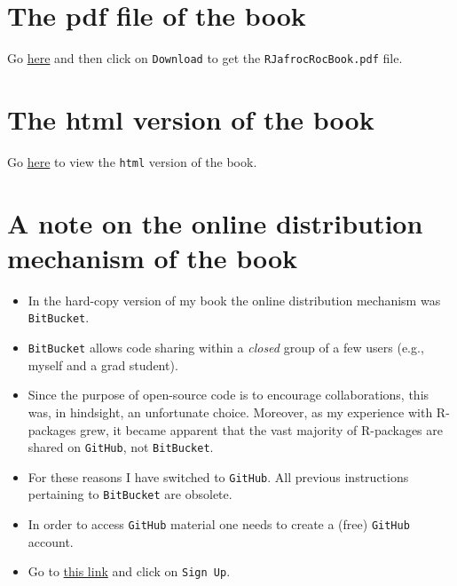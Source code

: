\documentclass[
]{book}
\providecommand{\tightlist}{%
  \setlength{\itemsep}{0pt}\setlength{\parskip}{0pt}}
\begin{document}
\hypertarget{the-pdf-file-of-the-book}{%
\section*{The pdf file of the book}\label{the-pdf-file-of-the-book}}

Go \href{https://github.com/dpc10ster/RJafrocRocBook/blob/gh-pages/RJafrocRocBook.pdf}{here} and then click on \texttt{Download} to get the \texttt{RJafrocRocBook.pdf} file.

\hypertarget{the-html-version-of-the-book}{%
\section*{The html version of the book}\label{the-html-version-of-the-book}}

Go \href{https://dpc10ster.github.io/RJafrocRocBook/}{here} to view the \texttt{html} version of the book.

\hypertarget{a-note-on-the-online-distribution-mechanism-of-the-book}{%
\section*{A note on the online distribution mechanism of the book}\label{a-note-on-the-online-distribution-mechanism-of-the-book}}

\begin{itemize}
\tightlist
\item
  In the hard-copy version of my book \citep{chakraborty2017observer} the online distribution mechanism was \texttt{BitBucket}.
\item
  \texttt{BitBucket} allows code sharing within a \emph{closed} group of a few users (e.g., myself and a grad student).
\item
  Since the purpose of open-source code is to encourage collaborations, this was, in hindsight, an unfortunate choice. Moreover, as my experience with R-packages grew, it became apparent that the vast majority of R-packages are shared on \texttt{GitHub}, not \texttt{BitBucket}.
\item
  For these reasons I have switched to \texttt{GitHub}. All previous instructions pertaining to \texttt{BitBucket} are obsolete.
\item
  In order to access \texttt{GitHub} material one needs to create a (free) \texttt{GitHub} account.
\item
  Go to \href{https://github.com}{this link} and click on \texttt{Sign\ Up}.
\end{itemize}
\end{document}
